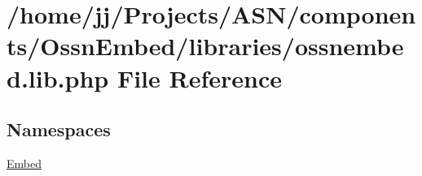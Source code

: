 \hypertarget{ossnembed_8lib_8php}{}\section{/home/jj/\+Projects/\+A\+S\+N/components/\+Ossn\+Embed/libraries/ossnembed.lib.\+php File Reference}
\label{ossnembed_8lib_8php}
\subsection*{Namespaces}
\begin{DoxyCompactItemize}
\item 
 \hyperlink{namespace_embed}{Embed}
\end{DoxyCompactItemize}
